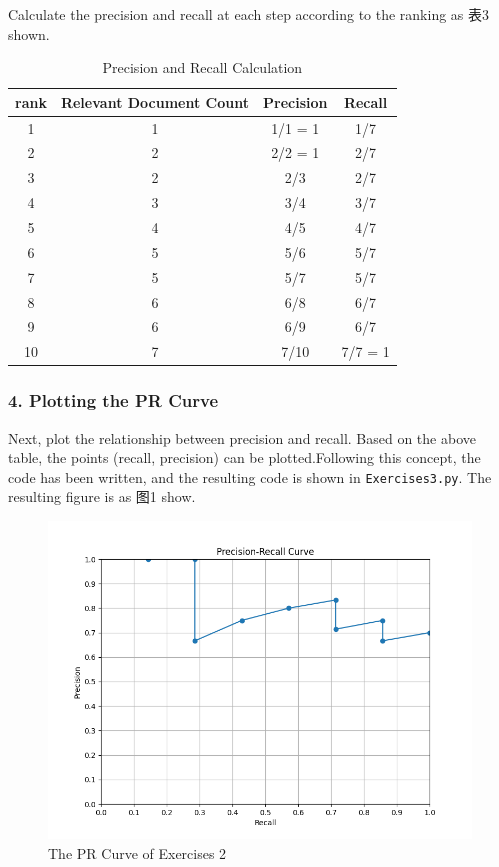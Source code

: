 \documentclass[a4paper, utf8]{ctexart}
\begin{document}
	Calculate the precision and recall at each step according to the ranking as 表3 shown.
	
	\begin{table}[htbp]
	    \centering
	    \caption{Precision and Recall Calculation}
	    \begin{tabular}{cccc}
	        \hline
	        rank & Relevant Document Count & Precision    & Recall      \\
	        \hline
	        1    & 1                      & 1/1 = 1     & 1/7        \\
	        2    & 2                      & 2/2 = 1     & 2/7        \\
	        3    & 2                      & 2/3         & 2/7        \\
	        4    & 3                      & 3/4         & 3/7        \\
	        5    & 4                      & 4/5         & 4/7        \\
	        6    & 5                      & 5/6         & 5/7        \\
	        7    & 5                      & 5/7         & 5/7        \\
	        8    & 6                      & 6/8         & 6/7        \\
	        9    & 6                      & 6/9         & 6/7        \\
	        10   & 7                      & 7/10        & 7/7 = 1    \\
	        \hline
	    \end{tabular}
	\end{table}
	
	\subsubsection*{4. Plotting the PR Curve}  
	Next, plot the relationship between precision and recall. Based on the above table, the points (recall, precision) can be plotted.Following this concept, the code has been written, and the resulting code is shown in \verb|Exercises3.py|. The resulting figure is as 图1 show.
	
	\begin{figure}[htbp]
		\centering
		\includegraphics[width=.8\textwidth]{./figure/figure1.png}
		\caption{The PR Curve of Exercises 2}
	\end{figure}
	
\end{document}
